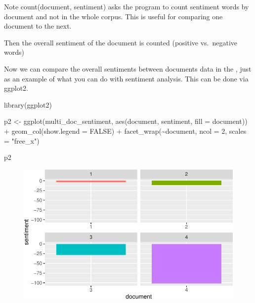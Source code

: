 \documentclass[
  letterpaper,
  DIV=11,
  numbers=noendperiod]{scrartcl}
\newenvironment{Shaded}{\begin{snugshade}}{\end{snugshade}}
\newcommand{\AttributeTok}[1]{\textcolor[rgb]{0.40,0.45,0.13}{#1}}
\newcommand{\ConstantTok}[1]{\textcolor[rgb]{0.56,0.35,0.01}{#1}}
\newcommand{\DecValTok}[1]{\textcolor[rgb]{0.68,0.00,0.00}{#1}}
\newcommand{\FunctionTok}[1]{\textcolor[rgb]{0.28,0.35,0.67}{#1}}
\newcommand{\NormalTok}[1]{\textcolor[rgb]{0.00,0.23,0.31}{#1}}
\newcommand{\OtherTok}[1]{\textcolor[rgb]{0.00,0.23,0.31}{#1}}
\newcommand{\SpecialCharTok}[1]{\textcolor[rgb]{0.37,0.37,0.37}{#1}}
\newcommand{\StringTok}[1]{\textcolor[rgb]{0.13,0.47,0.30}{#1}}
\begin{document}
Note count(document, sentiment) asks the program to count sentiment
words by document and not in the whole corpus. This is useful for
comparing one document to the next.

Then the overall sentiment of the document is counted (positive
vs.~negative words)

Now we can compare the overall sentiments between documents data in the
, just as an example of what you can do with sentiment analysis. This
can be done via ggplot2.

\begin{Shaded}
\begin{Highlighting}[]
\FunctionTok{library}\NormalTok{(ggplot2)}

\NormalTok{p2 }\OtherTok{\textless{}{-}} \FunctionTok{ggplot}\NormalTok{(multi\_doc\_sentiment, }\FunctionTok{aes}\NormalTok{(document, sentiment, }\AttributeTok{fill =}\NormalTok{ document)) }\SpecialCharTok{+}
  \FunctionTok{geom\_col}\NormalTok{(}\AttributeTok{show.legend =} \ConstantTok{FALSE}\NormalTok{) }\SpecialCharTok{+}
  \FunctionTok{facet\_wrap}\NormalTok{(}\SpecialCharTok{\textasciitilde{}}\NormalTok{document, }\AttributeTok{ncol =} \DecValTok{2}\NormalTok{, }\AttributeTok{scales =} \StringTok{"free\_x"}\NormalTok{)}
\end{Highlighting}
\end{Shaded}

\begin{Shaded}
\begin{Highlighting}[]
\NormalTok{p2}
\end{Highlighting}
\end{Shaded}

\begin{figure}[H]

{\centering \includegraphics{working_with_text1_files/figure-pdf/unnamed-chunk-19-1.pdf}

}

\end{figure}
\end{document}
